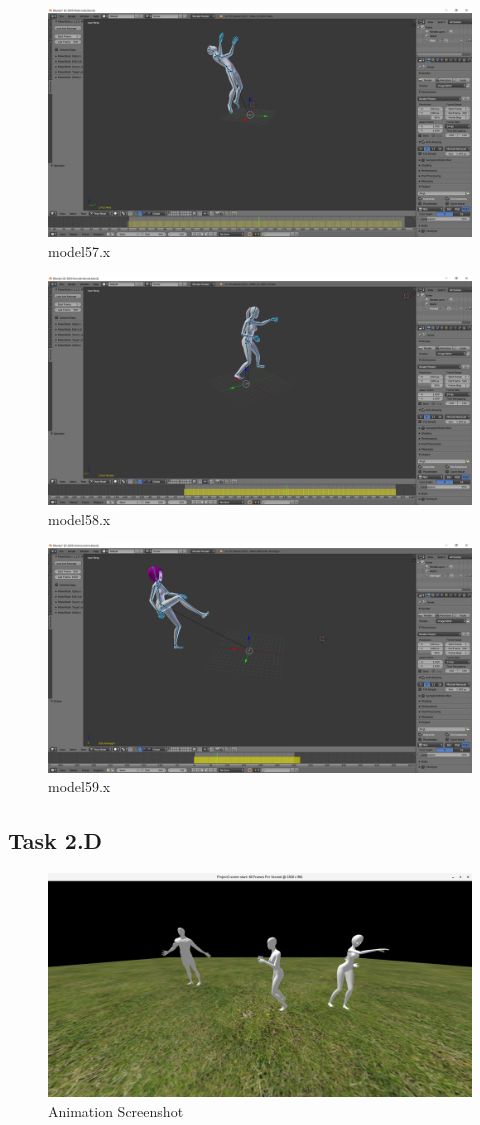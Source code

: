 \documentclass{article}
\begin{document}
\begin{figure}[h!]
	\centering
	\includegraphics[width=0.6 \linewidth]{MaleAnimation.png}
	\caption{model57.x}
\end{figure}

\begin{figure}[h!]
	\centering
	\includegraphics[width=0.6 \linewidth]{FemaleAnimation.png}
	\caption{model58.x}
\end{figure}

\begin{figure}[h!]
	\centering
	\includegraphics[width=0.6 \linewidth]{AnimeAnimation.png}
	\caption{model59.x}
\end{figure}

\newpage

\subsection{Task 2.D}\label{sec:2D}

\begin{figure}[h!]
	\centering
	\includegraphics[width= \linewidth]{Animation.png}
	\caption{Animation Screenshot}
\end{figure}
\end{document}
